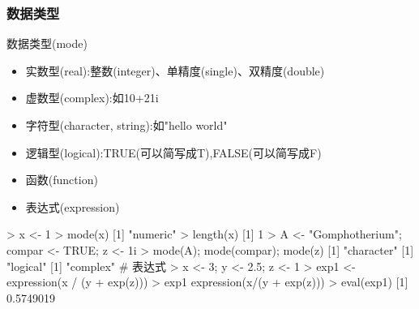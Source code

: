 \subsubsection{数据类型}
\begin{frame}[t, fragile]{\subsecname}{数据类型(mode)}
  \begin{itemize}
  \item 实数型(real):整数(integer)、单精度(single)、双精度(double)
  \item 虚数型(complex):如10+21i
  \item 字符型(character, string):如"hello world"
  \item 逻辑型(logical):TRUE(可以简写成T),FALSE(可以简写成F)
  \item 函数(function)
  \item 表达式(expression)
  \end{itemize}

\begin{overlayarea}{\textwidth}{\textheight}
\begin{rcode}
> x <- 1
> mode(x)
[1] "numeric"
> length(x)
[1] 1
> A <- "Gomphotherium"; compar <- TRUE; z <- 1i
> mode(A); mode(compar); mode(z)
[1] "character"
[1] "logical"
[1] "complex"
# 表达式
> x <- 3; y <- 2.5; z <- 1
> exp1 <- expression(x / (y + exp(z)))
> exp1
expression(x/(y + exp(z)))
> eval(exp1)
[1] 0.5749019
\end{rcode}
\end{overlayarea}
\end{frame}


